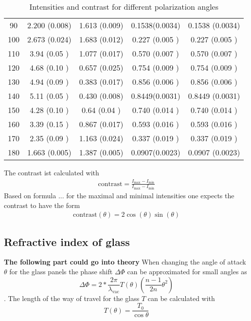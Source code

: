 \begin{table}[H]
\begin{tabular}{S S S S S}
		90                            & 2.200 (0.008)                 & 1.613 (0.009)                 & 0.1538(0.0034) & 0.1538 (0.0034) \\
		100                           & 2.673 (0.024)                 & 1.683 (0.012)                 & 0.227 (0.005 ) & 0.227 (0.005 )  \\
		110                           & 3.94  (0.05 )                 & 1.077 (0.017)                 & 0.570 (0.007 ) & 0.570 (0.007 )  \\
		120                           & 4.68  (0.10 )                 & 0.657 (0.025)                 & 0.754 (0.009 ) & 0.754 (0.009 )  \\
		130                           & 4.94  (0.09 )                 & 0.383 (0.017)                 & 0.856 (0.006 ) & 0.856 (0.006 )  \\
		140                           & 5.11  (0.05 )                 & 0.430 (0.008)                 & 0.8449(0.0031) & 0.8449 (0.0031) \\
		150                           & 4.28  (0.10 )                 & 0.64  (0.04 )                 & 0.740 (0.014 ) & 0.740 (0.014 )  \\
		160                           & 3.39  (0.15 )                 & 0.867 (0.017)                 & 0.593 (0.016 ) & 0.593 (0.016 )  \\
		170                           & 2.35  (0.09 )                 & 1.163 (0.024)                 & 0.337 (0.019 ) & 0.337 (0.019 )  \\
		180                           & 1.663 (0.005)                 & 1.387 (0.005)                 & 0.0907(0.0023) & 0.0907 (0.0023) \\
        \bottomrule
	\end{tabular}
	\caption{Intensities and contrast for different polarization angles}
\end{table}

The contrast ist calculated with
\begin{align}
    \text{contrast} = \frac{I_\text{max} -I_\text{min}}{I_\text{max}-I_\text{min}}
\end{align}
Based on formula ... for the maximal and minimal intensities one expects the contrast to have the form
\begin{align}
    \text{contrast}(\theta) = 2\cos(\theta)\sin(\theta) 
\end{align}

\subsection{Refractive index of glass}
\textbf{The following part could go into theory}
When changing the angle of attack $\theta$ for the glass panels the phase shift $\Delta\Phi$ can be approximated for small angles
as 
$$\Delta\Phi = 2* \frac{2\pi}{\lambda_\text{vac}} T(\theta)\left(\frac{n-1}{2n} \theta^2 \right)$$.
The length of the way of travel for the glass $T$ can be calculated with
$$T(\theta) = \frac{T_0}{\cos\theta}$$

